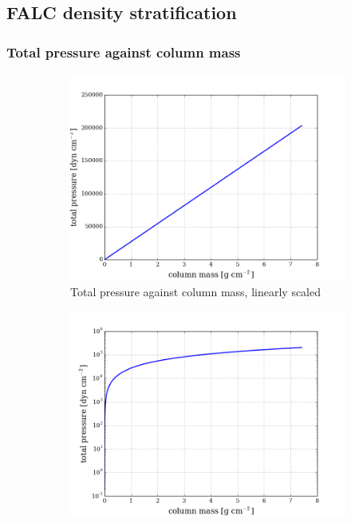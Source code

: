 \documentclass{article}
\begin{document}
\subsection{FALC density stratification}
\subsubsection{Total pressure against column mass}
\begin{figure}[H]
  \centering
  \begin{subfigure}{0.49\textwidth}
    \includegraphics[scale=0.37]{../figures/falc/falc_colm_ptot.png}
    \caption{Total pressure against column mass, linearly scaled}
  \end{subfigure}
  \begin{subfigure}{0.49\textwidth}
    \includegraphics[scale=0.37]{../figures/falc/falc_colm_ptot_ylog.png}

\end{subfigure}
\end{figure}
\end{document}

